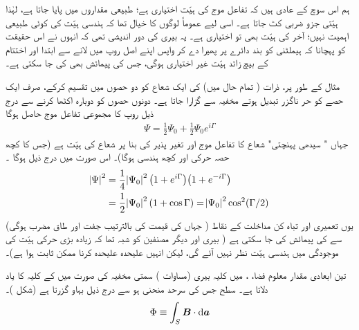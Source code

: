  ہم اس سوچ کے عادی ہیں کہ تفاعل موج کی  ہیّت اختیاری  ہے؛  طبیعی مقداروں میں   پایا جاتا ہے، لہٰذا   ہیّتی جزو ضربی  کٹ جاتا ہے۔  اسی لیے عموماً لوگوں کا خیال تھا کہ ہندسی ہیّت کی کوئی طبیعی اہمیت نہیں؛  آخر  کی  ہیّت بھی تو  اختیاری ہے۔  یہ  بیری کی دور اندیشی تھی  کہ انہوں نے اس حقیقت کو پہچانا کہ ہیملٹنی کو  بند دائرے پر  پھیرا دے کر  واپس اپنے  اصل روپ میں لانے سے ابتدا اور اختتام کے بیچ  زائد     ہیّت  غیر اختیاری ہوگی،    جس کی پیمائش بھی  کی جا سکتی  ہے۔
 
  مثال کے طور پر،  ذرات ( تمام حال  میں)  کی ایک شعاع کو دو حصوں میں تقسیم کرکے،  صرف ایک حصے کو حر ناگزر تبدیل ہوتے مخفیہ سے گزارا جاتا ہے۔ دونوں حصوں کو دوبارہ اکٹھا کرنے سے درج ذیل روپ کا  مجموعی تفاعل موج  حاصل ہوگا 
\begin{align}
\Psi = \frac{1}{2} \Psi_0 + \frac{1}{2} \Psi_0 e^{i \Gamma}
\end{align}
جہاں   " سیدھی پہنچتی"   شعاع کا تفاعل موج   اور     تغیر پذیر   کی بنا پر شعاع کی      ہیّت ہے  (جس کا کچھ حصہ حرکی اور کچھ ہندسی ہوگا)۔   اس صورت میں درج ذیل ہوگا ۔
\begin{align}
\abs{\Psi}^2 &= \frac{1}{4} \abs{\Psi_0}^2 \big ( 1 + e^{i \Gamma} \big ) \big ( 1 + e^{- i \Gamma} \big ) \nonumber\\
&= \frac{1}{2} \abs{\Psi_0}^2 (1 + \cos \Gamma) = \abs{\Psi_0}^2 \cos^2 (\Gamma/2)
\end{align}
یوں  تعمیری  اور تباہ کن مداخلت کے نقاط   ( جہاں  کی قیمت  کی بالترتیب جفت اور طاق مضرب ہوگی)  سے    کی پیمائش کی جا سکتی ہے ( بیری اور دیگر مصنفین کو شبہ تھا کہ زیادہ بڑی حرکی ہیّت کی موجودگی میں ہندسی  ہیّت  نظر نہیں آئے گی،  لیکن انہیں علیحدہ علیحدہ  کرنا ممکن ثابت ہوا ہے)۔ 

 تین ابعادی مقدار معلوم فضا،  ،    میں کلیہ  بیری  (مساوات )  سمتی مخفیہ  کی صورت میں    کے  کلیہ کا  یاد دلاتا ہے۔ سطح  جس کی سرحد منحنی  ہو سے درج ذیل  بہاو گزرتا ہے  (شکل )۔ 
\begin{align}
\Phi \equiv \int_S \kvec{B} \cdot \dif \kvec{a}
\end{align}

